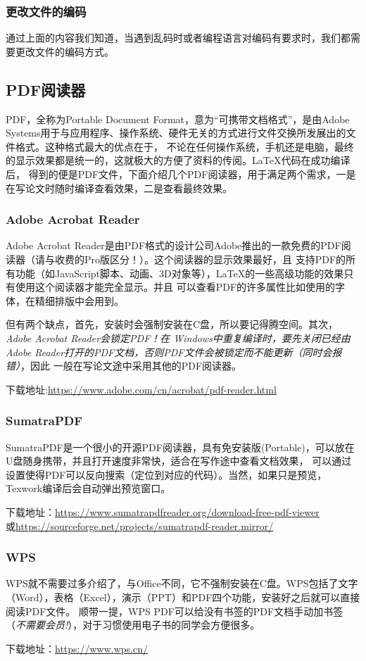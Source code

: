 \subsubsection{更改文件的编码}


通过上面的内容我们知道，当遇到乱码时或者编程语言对编码有要求时，我们都需要更改文件的编码方式。
\subsection{PDF阅读器}


PDF，全称为Portable Document Format，意为“可携带文档格式”，是由Adobe Systems用于与应用程序、操作系统、硬件无关的方式进行文件交换所发展出的文件格式。这种格式最大的优点在于，
不论在任何操作系统，手机还是电脑，最终的显示效果都是统一的，这就极大的方便了资料的传阅。\LaTeX{}代码在成功编译后，
得到的便是PDF文件，下面介绍几个PDF阅读器，用于满足两个需求，一是在写论文时随时编译查看效果，二是查看最终效果。



\subsubsection{Adobe Acrobat Reader}


Adobe Acrobat Reader是由PDF格式的设计公司Adobe推出的一款免费的PDF阅读器（请与收费的Pro版区分！）。这个阅读器的显示效果最好，且
支持PDF的所有功能（如JavaScript脚本、动画、3D对象等），\LaTeX{}的一些高级功能的效果只有使用这个阅读器才能完全显示。并且
可以查看PDF的许多属性比如使用的字体，在精细排版中会用到。

但有两个缺点，首先，安装时会强制安装在C盘，所以要记得腾空间。其次，\emph{Adobe Acrobat Reader会锁定PDF！在
Windows中重复编译时，要先关闭已经由Adobe Reader打开的PDF文档，否则PDF文件会被锁定而不能更新（同时会报错）}，因此
一般在写论文途中采用其他的PDF阅读器。

下载地址:\url{https://www.adobe.com/cn/acrobat/pdf-reader.html}
\subsubsection{SumatraPDF}
SumatraPDF是一个很小的开源PDF阅读器，具有免安装版(Portable)，可以放在U盘随身携带，并且打开速度非常快，适合在写作途中查看文档效果，
可以通过设置使得PDF可以反向搜索（定位到对应的代码）。当然，如果只是预览，Texwork编译后会自动弹出预览窗口。

下载地址：\url{https://www.sumatrapdfreader.org/download-free-pdf-viewer}\\或\url{https://sourceforge.net/projects/sumatrapdf-reader.mirror/}



\subsubsection{WPS}


WPS就不需要过多介绍了，与Office不同，它不强制安装在C盘。WPS包括了文字（Word），表格（Excel），演示（PPT）和PDF四个功能，安装好之后就可以直接阅读PDF文件。
顺带一提，WPS PDF可以给没有书签的PDF文档手动加书签（\emph{不需要会员!}），对于习惯使用电子书的同学会方便很多。

下载地址：\url{https://www.wps.cn/}